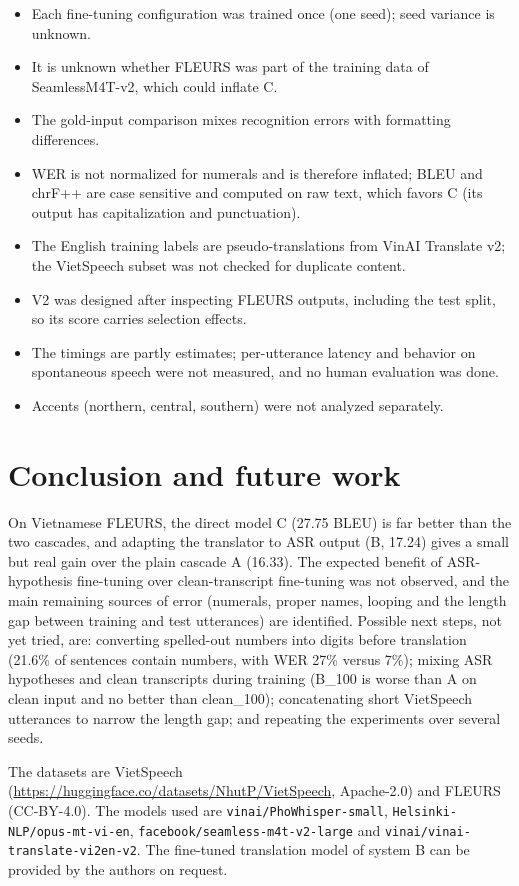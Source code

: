\documentclass[pdflatex,sn-mathphys-num]{sn-jnl}
\begin{document}
\begin{itemize}
\item Each fine-tuning configuration was trained once (one seed); seed variance is unknown.
\item It is unknown whether FLEURS was part of the training data of SeamlessM4T-v2, which could inflate C.
\item The gold-input comparison mixes recognition errors with formatting differences.
\item WER is not normalized for numerals and is therefore inflated; BLEU and chrF++ are case sensitive and computed on raw text, which favors C (its output has capitalization and punctuation).
\item The English training labels are pseudo-translations from VinAI Translate v2; the VietSpeech subset was not checked for duplicate content.
\item V2 was designed after inspecting FLEURS outputs, including the test split, so its score carries selection effects.
\item The timings are partly estimates; per-utterance latency and behavior on spontaneous speech were not measured, and no human evaluation was done.
\item Accents (northern, central, southern) were not analyzed separately.
\end{itemize}

\section{Conclusion and future work}\label{sec:concl}

On Vietnamese FLEURS, the direct model C (27.75 BLEU) is far better than the two cascades, and adapting the translator to ASR output (B, 17.24) gives a small but real gain over the plain cascade A (16.33). The expected benefit of ASR-hypothesis fine-tuning over clean-transcript fine-tuning was not observed, and the main remaining sources of error (numerals, proper names, looping and the length gap between training and test utterances) are identified. Possible next steps, not yet tried, are: converting spelled-out numbers into digits before translation (21.6\% of sentences contain numbers, with WER 27\% versus 7\%); mixing ASR hypotheses and clean transcripts during training (B\_100 is worse than A on clean input and no better than clean\_100); concatenating short VietSpeech utterances to narrow the length gap; and repeating the experiments over several seeds.

\backmatter

The datasets are VietSpeech (\url{https://huggingface.co/datasets/NhutP/VietSpeech}, Apache-2.0) and FLEURS (CC-BY-4.0). The models used are \texttt{vinai/PhoWhisper-small}, \texttt{Helsinki-NLP/opus-mt-vi-en}, \texttt{facebook/seamless-m4t-v2-large} and \texttt{vinai/vinai-translate-vi2en-v2}. The fine-tuned translation model of system B can be provided by the authors on request.


\end{document}
